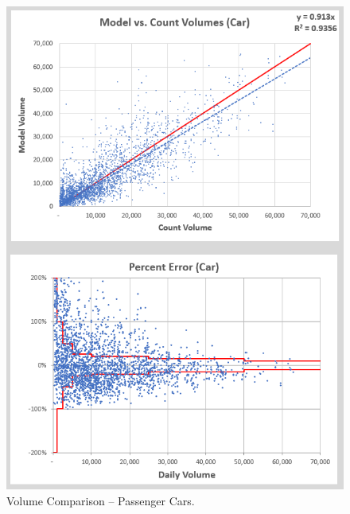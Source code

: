 \documentclass[
  letterpaper,
  DIV=11,
  numbers=noendperiod]{scrreprt}
\begin{document}
\begin{figure}[H]

{\centering \includegraphics[width=\textwidth,height=0.6\textheight]{v9x/v900/validation/_pictures/7-plot3.png}

}

\caption{\label{fig-pc}Volume Comparison -- Passenger Cars.}

\end{figure}
\end{document}
